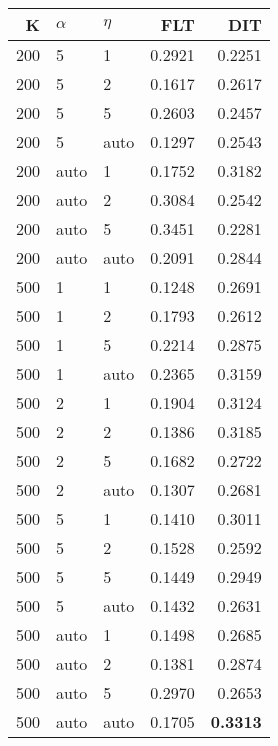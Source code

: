 \begin{table}
\begin{spacing}{1.2}
{\begin{tabular}{rll|rr}
\bottomrule
\end{tabular}
} \hfill \parbox{.45\linewidth}{\centering \begin{tabular}{rll|rr}
\toprule
   K & $\alpha$ &   $\eta$ & FLT &       DIT \\
\midrule
 200 &     5 &     1 &           0.2921 &       0.2251 \\
 200 &     5 &     2 &           0.1617 &       0.2617 \\
 200 &     5 &     5 &           0.2603 &       0.2457 \\
 200 &     5 &  auto &           0.1297 &       0.2543 \\
 200 &  auto &     1 &           0.1752 &       0.3182 \\
 200 &  auto &     2 &           0.3084 &       0.2542 \\
 200 &  auto &     5 &           0.3451 &       0.2281 \\
 200 &  auto &  auto &           0.2091 &       0.2844 \\
 500 &     1 &     1 &           0.1248 &       0.2691 \\
 500 &     1 &     2 &           0.1793 &       0.2612 \\
 500 &     1 &     5 &           0.2214 &       0.2875 \\
 500 &     1 &  auto &           0.2365 &       0.3159 \\
 500 &     2 &     1 &           0.1904 &       0.3124 \\
 500 &     2 &     2 &           0.1386 &       0.3185 \\
 500 &     2 &     5 &           0.1682 &       0.2722 \\
 500 &     2 &  auto &           0.1307 &       0.2681 \\
 500 &     5 &     1 &           0.1410 &       0.3011 \\
 500 &     5 &     2 &           0.1528 &       0.2592 \\
 500 &     5 &     5 &           0.1449 &       0.2949 \\
 500 &     5 &  auto &           0.1432 &       0.2631 \\
 500 &  auto &     1 &           0.1498 &       0.2685 \\
 500 &  auto &     2 &           0.1381 &       0.2874 \\
 500 &  auto &     5 &           0.2970 &       0.2653 \\
 500 &  auto &  auto &           0.1705 & {\bf 0.3313} \\
\bottomrule
\end{tabular}
}
\end{spacing}
\end{table}
